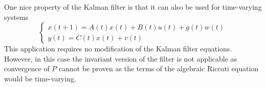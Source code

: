 \documentclass{book}
\begin{document}
One nice property of the Kalman filter is that it can also be used for time-varying systems
\[
    \begin{cases}
        x(t+1)=A(t)x(t)+B(t)u(t)+g(t)w(t)\\
        y(t)=C(t)x(t)+v(t)
    \end{cases}
\]
This application requires no modification of the Kalman filter equations. However, in this case the invariant version of the filter is not applicable as convergence of $P$ cannot be proven as the terms of the algebraic Riccati equation would be time-varying.
\end{document}
